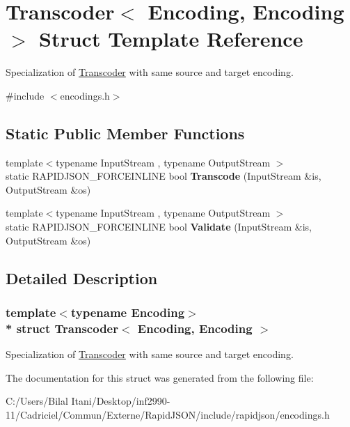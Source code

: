 \hypertarget{struct_transcoder_3_01_encoding_00_01_encoding_01_4}{}\section{Transcoder$<$ Encoding, Encoding $>$ Struct Template Reference}
\label{struct_transcoder_3_01_encoding_00_01_encoding_01_4}


Specialization of \hyperlink{struct_transcoder}{Transcoder} with same source and target encoding.  




{\ttfamily \#include $<$encodings.\+h$>$}

\subsection*{Static Public Member Functions}
\begin{DoxyCompactItemize}
\item 
{\footnotesize template$<$typename Input\+Stream , typename Output\+Stream $>$ }\\static R\+A\+P\+I\+D\+J\+S\+O\+N\+\_\+\+F\+O\+R\+C\+E\+I\+N\+L\+I\+NE bool {\bfseries Transcode} (Input\+Stream \&is, Output\+Stream \&os)\hypertarget{struct_transcoder_3_01_encoding_00_01_encoding_01_4_aad11cdc2b829123a7b9969e34d456813}{}\label{struct_transcoder_3_01_encoding_00_01_encoding_01_4_aad11cdc2b829123a7b9969e34d456813}

\item 
{\footnotesize template$<$typename Input\+Stream , typename Output\+Stream $>$ }\\static R\+A\+P\+I\+D\+J\+S\+O\+N\+\_\+\+F\+O\+R\+C\+E\+I\+N\+L\+I\+NE bool {\bfseries Validate} (Input\+Stream \&is, Output\+Stream \&os)\hypertarget{struct_transcoder_3_01_encoding_00_01_encoding_01_4_a536aa3930251161d05e112947ec2f9c8}{}\label{struct_transcoder_3_01_encoding_00_01_encoding_01_4_a536aa3930251161d05e112947ec2f9c8}

\end{DoxyCompactItemize}


\subsection{Detailed Description}
\subsubsection*{template$<$typename Encoding$>$\\*
struct Transcoder$<$ Encoding, Encoding $>$}

Specialization of \hyperlink{struct_transcoder}{Transcoder} with same source and target encoding. 

The documentation for this struct was generated from the following file\+:\begin{DoxyCompactItemize}
\item 
C\+:/\+Users/\+Bilal Itani/\+Desktop/inf2990-\/11/\+Cadriciel/\+Commun/\+Externe/\+Rapid\+J\+S\+O\+N/include/rapidjson/encodings.\+h\end{DoxyCompactItemize}
